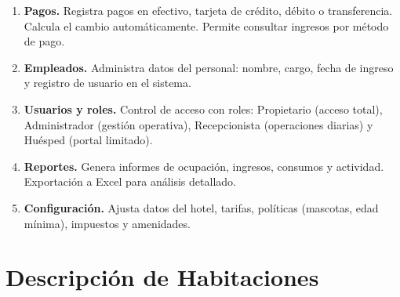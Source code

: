 \documentclass[12pt,a4paper]{article}
\begin{document}
\begin{enumerate}[leftmargin=*]
    \item \textbf{Pagos.} Registra pagos en efectivo, tarjeta de crédito, débito o transferencia. Calcula el cambio automáticamente. Permite consultar ingresos por método de pago.
    \item \textbf{Empleados.} Administra datos del personal: nombre, cargo, fecha de ingreso y registro de usuario en el sistema.
    \item \textbf{Usuarios y roles.} Control de acceso con roles: Propietario (acceso total), Administrador (gestión operativa), Recepcionista (operaciones diarias) y Huésped (portal limitado).
    \item \textbf{Reportes.} Genera informes de ocupación, ingresos, consumos y actividad. Exportación a Excel para análisis detallado.
    \item \textbf{Configuración.} Ajusta datos del hotel, tarifas, políticas (mascotas, edad mínima), impuestos y amenidades.
\end{enumerate}

\section{Descripción de Habitaciones}
\end{document}
